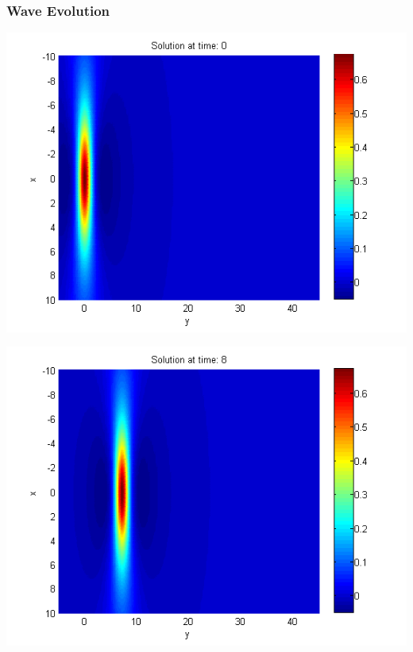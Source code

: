 \documentclass{beamer}
\begin{document}
\begin{frame}
\frametitle{Wave Evolution}
\begin{center}\vspace{0.4cm}
	\begin{minipage}[b]{0.30\linewidth}
		\includegraphics[width=\linewidth]{../amitans/figures/Solution1_t=0.png}
	\end{minipage}	
	\begin{minipage}[b]{0.30\linewidth}
		\includegraphics[width=\linewidth]{../amitans/figures/Solution1_t=8.png}
	\end{minipage}	
	\begin{minipage}[b]{0.30\linewidth}

\end{minipage}
\end{center}
\end{frame}
\end{document}
